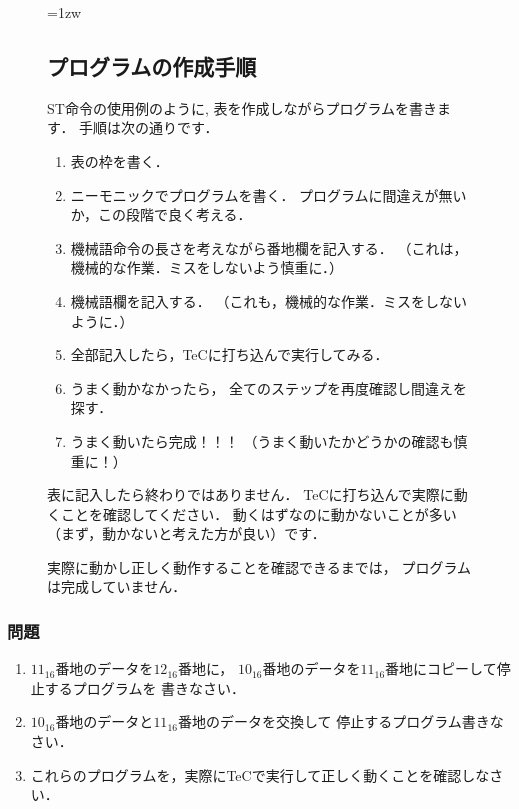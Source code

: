\begin{figure}[tbp]
\begin{framed}{\parindent=1zw
\subsection*{プログラムの作成手順}
ST命令の使用例のように,
表を作成しながらプログラムを書きます．
手順は次の通りです．
\begin{enumerate}
\item 表の枠を書く．
\item ニーモニックでプログラムを書く．
プログラムに間違えが無いか，この段階で良く考える．
\item 機械語命令の長さを考えながら番地欄を記入する．
（これは，機械的な作業．ミスをしないよう慎重に．）
\item 機械語欄を記入する．
（これも，機械的な作業．ミスをしないように．）
\item 全部記入したら，TeCに打ち込んで実行してみる．
\item うまく動かなかったら，
全てのステップを再度確認し間違えを探す．
\item うまく動いたら完成！！！
（うまく動いたかどうかの確認も慎重に！）
\end{enumerate}

表に記入したら終わりではありません．
TeCに打ち込んで実際に動くことを確認してください．
動くはずなのに動かないことが多い（まず，動かないと考えた方が良い）です．

実際に動かし正しく動作することを確認できるまでは，
プログラムは完成していません．
}\end{framed}
\end{figure}

\vfill
\subsubsection{問題}
\begin{enumerate}
\item $11_{16}$番地のデータを$12_{16}$番地に，
$10_{16}$番地のデータを$11_{16}$番地にコピーして停止するプログラムを
書きなさい．
\item $10_{16}$番地のデータと$11_{16}$番地のデータを交換して
停止するプログラム書きなさい．
\item これらのプログラムを，実際にTeCで実行して正しく動くことを確認しなさい．
\end{enumerate}
\vfill

